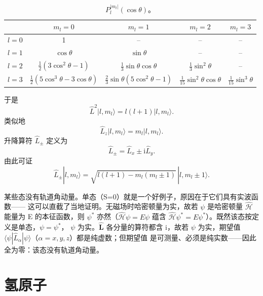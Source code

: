 \begin{table}
\centering
\caption{$P_{l}^{|m_l|}(\cos\theta)$。}
\begin{small}
\begin{tabular}{lcccc}
\toprule
 & $m_l=0$ & $m_l=1$ & $m_l=2$ & $m_l=3$\\
\midrule
$l=0$ & 1 & -- & -- & --\\
$l=1$ & $\cos\theta$ & $\sin\theta$ & -- & --\\
$l=2$ & $\frac{1}{2}(3\cos^{2}\theta-1)$ & $\frac{1}{3}\sin\theta\cos\theta$ & $\frac{1}{3}\sin^{2}\theta$ & --\\
$l=3$ & $\frac{1}{2}(5\cos^{3}\theta-3\cos\theta)$ & $\frac{2}{3}\sin\theta(5\cos^{2}\theta-1)$ & $\frac{1}{15}\sin^{2}\theta\cos\theta$ & $\frac{1}{15}\sin^{3}\theta$\\
\bottomrule
\end{tabular}
\end{small}
\end{table}

于是
\begin{equation*}
\hat{L}^{2}|l, m_l\rangle = l(l+1)|l, m_l\rangle.\tag{C.30}
\end{equation*}
类似地
\begin{equation*}
\hat{L}_z|l, m_l\rangle = m_l|l, m_l\rangle.\tag{C.31}
\end{equation*}
升降算符 $\hat{L}_{\pm}$ 定义为
\begin{equation*}
\hat{L}_{\pm} = \hat{L}_x \pm \mathrm{i}\hat{L}_y.\tag{C.32}
\end{equation*}
由此可证
\begin{equation*}
\hat{L}_{\pm}|l, m_l\rangle = \sqrt{l(l+1)-m_l(m_l\pm1)}\,|l, m_l\pm1\rangle.\tag{C.33}
\end{equation*}

某些态没有轨道角动量。单态（S=0）就是一个好例子，原因在于它们具有实波函数——
这可以直截了当地证明。无磁场时哈密顿量为实，故若 $\psi$ 是哈密顿量 $\hat{\mathcal{H}}$
能量为 E 的本征函数，则 $\psi^{*}$ 亦然（$\hat{\mathcal{H}}\psi=E\psi$ 蕴含
$\hat{\mathcal{H}}\psi^{*}=E\psi^{*}$）。既然该态按定义是单态，$\psi=\psi^{*}$，
$\psi$ 为实。$\hat{\mathbf{L}}$ 各分量的算符都含 i，故若 $\psi$ 为实，期望值
$\langle\psi|\hat{L}_{\alpha}|\psi\rangle$（$\alpha=x,y,z$）都是纯虚数；但期望值
是可测量、必须是纯实数——因此全为零：该态没有轨道角动量。

\section{氢原子}

